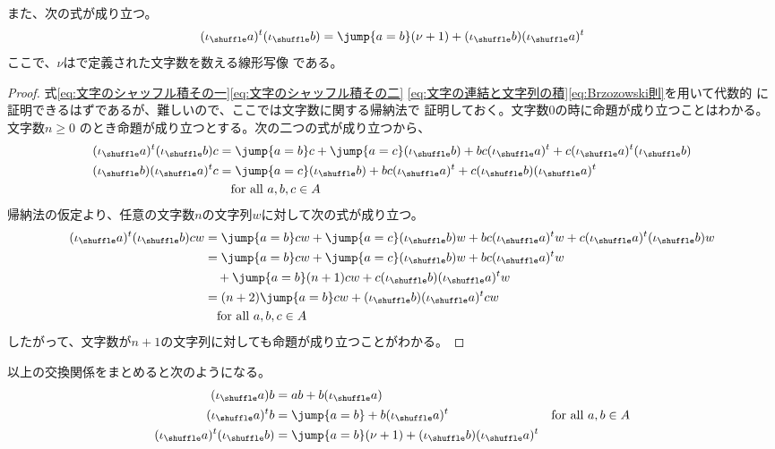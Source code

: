 	また、次の式が成り立つ。
	\begin{equation*}\begin{split} %
		(\iota_\shuffle a)^t(\iota_\shuffle b) = \jump{a=b}(\nu + 1)
		+ (\iota_\shuffle b)(\iota_\shuffle a)^t \\
	\end{split}\end{equation*} %
	ここで、$\nu$は\label{eq:文字数作用素}で定義された文字数を数える線形写像
	である。
	\begin{proof} %
		式\eqref{eq:文字のシャッフル積その一}\eqref{eq:文字のシャッフル積その二}
		\eqref{eq:文字の連結と文字列の積}\eqref{eq:Brzozowski則}を用いて代数的
		に証明できるはずであるが、難しいので、ここでは文字数に関する帰納法で
		証明しておく。文字数$0$の時に命題が成り立つことはわかる。文字数$n\ge0$
		のとき命題が成り立つとする。次の二つの式が成り立つから、
		\begin{equation*}\begin{split} %
			(\iota_\shuffle a)^t(\iota_\shuffle b)c
			&= \jump{a=b}c + \jump{a=c}(\iota_\shuffle b) + bc(\iota_\shuffle a)^t
			+ c(\iota_\shuffle a)^t(\iota_\shuffle b) \\
			(\iota_\shuffle b)(\iota_\shuffle a)^tc
			&= \jump{a=c}(\iota_\shuffle b) + bc(\iota_\shuffle a)^t
			+ c(\iota_\shuffle b)(\iota_\shuffle a)^t \\
			&\quad\text{for all }a,b,c\in A
		\end{split}\end{equation*} %
		帰納法の仮定より、任意の文字数$n$の文字列$w$に対して次の式が成り立つ。
		\begin{equation*}\begin{split} %
			(\iota_\shuffle a)^t(\iota_\shuffle b)cw
			&= \jump{a=b}cw + \jump{a=c}(\iota_\shuffle b)w 
			+ bc(\iota_\shuffle a)^tw
			+ c(\iota_\shuffle a)^t(\iota_\shuffle b)w \\
			&= \jump{a=b}cw + \jump{a=c}(\iota_\shuffle b)w 
			+ bc(\iota_\shuffle a)^tw \\
			&\quad + \jump{a=b}(n+1)cw
			+ c(\iota_\shuffle b)(\iota_\shuffle a)^tw \\
			&= (n+2)\jump{a=b}cw + (\iota_\shuffle b)(\iota_\shuffle a)^tcw \\
			&\quad\text{for all }a,b,c\in A
		\end{split}\end{equation*} %
		したがって、文字数が$n+1$の文字列に対しても命題が成り立つことがわかる。
	\end{proof} %
	以上の交換関係をまとめると次のようになる。
	\begin{equation}\begin{split} %
		(\iota_\shuffle a)b &= ab + b(\iota_\shuffle a) \\
		(\iota_\shuffle a)^tb &= \jump{a=b} + b(\iota_\shuffle a)^t \\
		(\iota_\shuffle a)^t(\iota_\shuffle b) &= \jump{a=b}(\nu + 1)
			+ (\iota_\shuffle b)(\iota_\shuffle a)^t \\
	\end{split}
		\quad\text{for all }a,b\in A
	\end{equation} %

